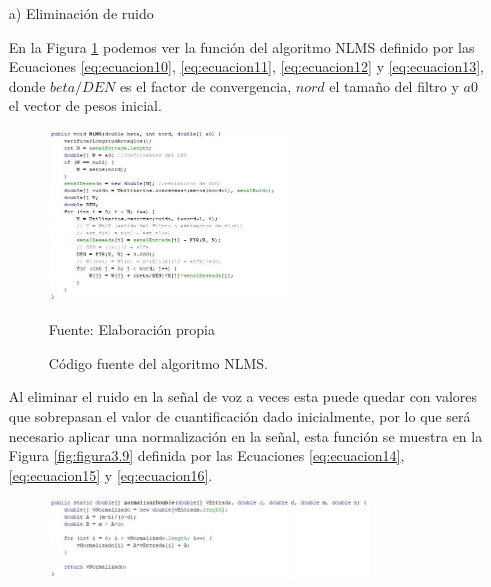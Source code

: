 \begin{enumerate}
\item[a)]Eliminación de ruido
\par
En la Figura \ref{fig:figura3.8} podemos ver la función del algoritmo NLMS definido por las Ecuaciones \eqref{eq:ecuacion10}, \eqref{eq:ecuacion11}, \eqref{eq:ecuacion12} y \eqref{eq:ecuacion13}, donde $beta/DEN$ es el factor de convergencia, $nord$ el tamaño del filtro y $a0$ el vector de pesos inicial.
\begin{figure}[H]
\captionsetup{justification=centering}
\begin{center}
\includegraphics[width=0.6\textwidth]{Imagenes/Cap3/image008}
\end{center}
\begin{center}
\vskip -0.5cm
\caption{\small{Código fuente del algoritmo NLMS.}}
\label{fig:figura3.8}
{\small{Fuente: Elaboración propia}}
\end{center}
\end{figure}
\vskip -0.5cm
Al eliminar el ruido en la señal de voz a veces esta puede quedar con valores que sobrepasan el valor de cuantificación dado inicialmente, por lo que será necesario aplicar una normalización en la señal, esta función se muestra en la Figura \ref{fig:figura3.9} definida por las Ecuaciones \eqref{eq:ecuacion14}, \eqref{eq:ecuacion15} y \eqref{eq:ecuacion16}.
\begin{figure}[H]
\captionsetup{justification=centering}
\begin{center}
\includegraphics[width=0.8\textwidth]{Imagenes/Cap3/image009}
\end{center}
\begin{center}

\end{center}
\end{figure}
\end{enumerate}

